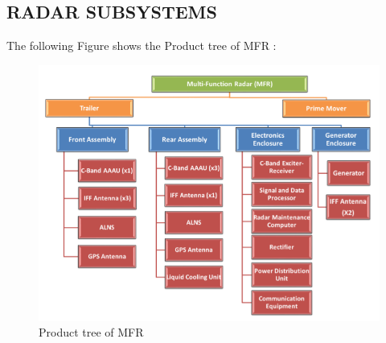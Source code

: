 \documentclass[14pt]{article} %
\begin{document}
\subsection{RADAR SUBSYSTEMS}
\noindent The following Figure shows the Product tree of MFR : 
 \begin{figure}[H]
  \includegraphics[width=\linewidth]{MFR.png}
  \caption{Product tree of MFR}
  \label{fig:figure 11}
\end{figure}
\end{document}
